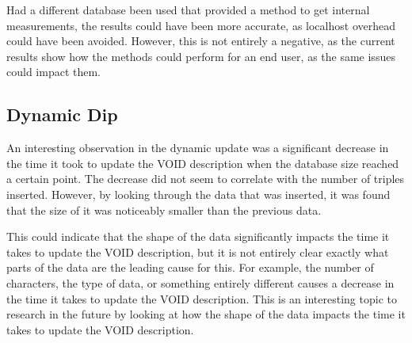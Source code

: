 Had a different database been used that provided a method to get internal measurements, the results could have been more accurate, as localhost overhead could have been avoided. However, this is not entirely a negative, as the current results show how the methods could perform for an end user, as the same issues could impact them.

\subsection{Dynamic Dip}\label{subsec:dynamic-dip}
An interesting observation in the dynamic update was a significant decrease in the time it took to update the VOID description when the database size reached a certain point. The decrease did not seem to correlate with the number of triples inserted. However, by looking through the data that was inserted, it was found that the size of it was noticeably smaller than the previous data.

This could indicate that the shape of the data significantly impacts the time it takes to update the VOID description, but it is not entirely clear exactly what parts of the data are the leading cause for this. For example, the number of characters, the type of data, or something entirely different causes a decrease in the time it takes to update the VOID description. This is an interesting topic to research in the future by looking at how the shape of the data impacts the time it takes to update the VOID description.








